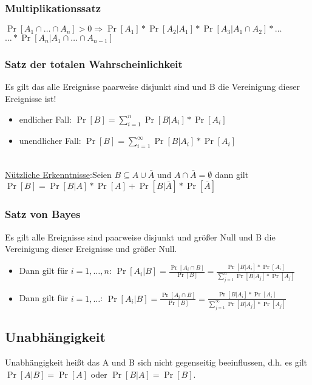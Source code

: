 \subsubsection{Multiplikationssatz}
$\Pr[A_1\cap\ldots\cap A_n]>0\Rightarrow\Pr[A_1]*\Pr[A_2|A_1]*\Pr[A_3|A_1\cap A_2]*\ldots$\\
$\dots*\Pr[A_n|A_1\cap\ldots\cap A_{n-1}]$

\subsubsection{Satz der totalen Wahrscheinlichkeit}
Es gilt das alle Ereignisse paarweise disjunkt sind und B die Vereinigung dieser Ereignisse ist!
\begin{itemize}
\item endlicher Fall: $\Pr[B]=\sum_{i=1}^n\Pr[B|A_i]*\Pr[A_i]$
\item unendlicher Fall: $\Pr[B]=\sum_{i=1}^\infty\Pr[B|A_i]*\Pr[A_i]$
\end{itemize}
\\
\underline{Nützliche Erkenntnisse}:Seien $B\subseteq A\cup\bar A$ und $A\cap\bar A =\emptyset$ dann gilt $\Pr[B]=\Pr[B|A]*\Pr[A]+\Pr[B|\bar A]*\Pr[\bar A]$

\subsubsection{Satz von Bayes}
Es gilt alle Ereignisse sind paarweise disjunkt und größer Null und B die Vereinigung dieser Ereignisse und größer Null.
\begin{itemize}
\item Dann gilt für $i=1,\ldots,n$: $\Pr[A_i|B]=\frac{\Pr[A_i\cap B]}{\Pr[B]}=\frac{\Pr[B|A_i]*\Pr[A_i]}{\sum^n_{j=1}\Pr[B|A_j]*\Pr[A_j]}$
\item Dann gilt für $i=1,\ldots$: $\Pr[A_i|B]=\frac{\Pr[A_i\cap B]}{\Pr[B]}=\frac{\Pr[B|A_i]*\Pr[A_i]}{\sum^\infty_{j=1}\Pr[B|A_j]*\Pr[A_j]}$
\end{itemize}

\subsection{Unabhängigkeit}
Unabhängigkeit heißt das A und B sich nicht gegenseitig beeinflussen, d.h. es gilt $\Pr[A|B]=\Pr[A]$ oder $\Pr[B|A]=\Pr[B]$.

